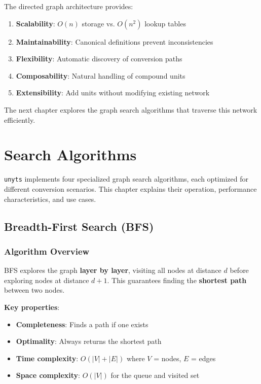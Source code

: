 \documentclass[11pt,a4paper]{report}
\begin{document}
The directed graph architecture provides:
\begin{enumerate}[leftmargin=*]
  \item \textbf{Scalability}: $O(n)$ storage vs. $O(n^2)$ lookup tables
  \item \textbf{Maintainability}: Canonical definitions prevent inconsistencies
  \item \textbf{Flexibility}: Automatic discovery of conversion paths
  \item \textbf{Composability}: Natural handling of compound units
  \item \textbf{Extensibility}: Add units without modifying existing network
\end{enumerate}

The next chapter explores the graph search algorithms that traverse this network efficiently.


\chapter{Search Algorithms}

\texttt{unyts} implements four specialized graph search algorithms, each optimized for different conversion scenarios. This chapter explains their operation, performance characteristics, and use cases.

\section{Breadth-First Search (BFS)}

\subsection{Algorithm Overview}

BFS explores the graph \textbf{layer by layer}, visiting all nodes at distance $d$ before exploring nodes at distance $d+1$. This guarantees finding the \textbf{shortest path} between two nodes.

\textbf{Key properties}:
\begin{itemize}[leftmargin=*]
  \item \textbf{Completeness}: Finds a path if one exists
  \item \textbf{Optimality}: Always returns the shortest path
  \item \textbf{Time complexity}: $O(|V| + |E|)$ where $V$ = nodes, $E$ = edges
  \item \textbf{Space complexity}: $O(|V|)$ for the queue and visited set
\end{itemize}
\end{document}
